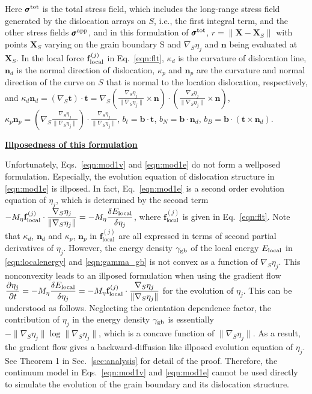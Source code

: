 Here $\pmb \sigma^{\rm tot}$ is the total stress field, which includes the
long-range stress field generated by the dislocation arrays on $S$, i.e., the first integral term, and the other stress fields $\pmb \sigma^{\rm app}$, and in this formulation of  $\pmb \sigma^{\rm tot}$,
 $r=\|\mathbf X-\mathbf X_S \| $ with points $ \mathbf X_S$ varying on the grain boundary S and $\nabla_S\eta_j$ and $\mathbf n$ being evaluated at $\mathbf X_S$. In the local force $\mathbf f_{\rm local} ^{(j)}$ in Eq.~\eqref{eqn:flt},   $\kappa_d$ is the curvature of dislocation line, $\mathbf n_d$ is the normal direction of dislocation, $\kappa_p$ and $\mathbf n_p$ are the curvature and normal direction of the curve on $S$ that is normal to the location dislocation, respectively, and $\kappa_d \mathbf n_d=(\nabla_S\mathbf t )\cdot \mathbf t=\nabla_S\left(\frac{\nabla_S \eta_j}{\|\nabla_S \eta_j\|}\times \mathbf n \right)\cdot \left(\frac{\nabla_S \eta_j}{\|\nabla_S \eta_j\|}\times \mathbf n\right)$, $\kappa_p \mathbf n_p=\left(\nabla_S \frac{\nabla_S \eta_j}{\|\nabla_S \eta_j\|} \right)\cdot \frac{\nabla_S \eta_j}{\|\nabla_S \eta_j\|} $, $b_t=\mathbf b\cdot \mathbf t$, $b_N=\mathbf b\cdot \mathbf n_d$, $b_B=\mathbf b\cdot (\mathbf t \times \mathbf n_d ) $.

\vspace{0.1in}
\noindent
\underline{\bf Illposedness of this formulation}

Unfortunately, Eqs.~\eqref{eqn:mod1v} and \eqref{eqn:mod1e} do not form a wellposed formulation. Especially,
the evolution equation of dislocation structure in \eqref{eqn:mod1e} is illposed.
In fact, Eq.~\eqref{eqn:mod1e} is a second order evolution equation of $\eta_j$, which is determined by the second term $-M_\eta \mathbf{f}^{(j)}_{\mathrm{local}}\cdot\dfrac{\nabla_S \eta_j}{\|\nabla_S \eta_j\|}=-M_\eta \dfrac{\delta E_{\rm local}}{\delta \eta_j}$,  where $\mathbf{f}^{(j)}_{\mathrm{local}}$ is given in Eq.~\eqref{eqn:flt}. Note that $\kappa_d$, $\mathbf n_d$ and $\kappa_p$, $\mathbf n_p$ in $\mathbf{f}^{(j)}_{\mathrm{local}}$ are all expressed in terms of second partial derivatives of $\eta_j$.
However,
the  energy density $\gamma_{\rm gb}$ of the local energy  $E_{\rm local}$ in \eqref{eqn:localenergy} and \eqref{eqn:gamma_gb} is not convex as a function of $\nabla_S \eta_j$.
This nonconvexity leads to an illposed formulation when using the gradient flow $\dfrac{\partial \eta_j}{\partial t}=-M_\eta \dfrac{\delta E_{\rm local}}{\delta \eta_j}=-M_\eta \mathbf{f}^{(j)}_{\mathrm{local}}\cdot\dfrac{\nabla_S \eta_j}{\|\nabla_S \eta_j\|}$ for the evolution of $\eta_j$.
This can be understood as follows. Neglecting the orientation dependence factor, the contribution of $\eta_j$ in the energy density $\gamma_{\rm gb}$ is essentially $-\|\nabla_S \eta_j\|\log\|\nabla_S \eta_j\|$, which is a concave function of $\|\nabla_S \eta_j\|$. As a result, the gradient flow gives a backward-diffusion like illposed evolution equation of $\eta_j$.  See Theorem 1 in Sec.~\ref{sec:analysis} for detail of the proof.
Therefore, the continuum model in Eqs.~\eqref{eqn:mod1v} and \eqref{eqn:mod1e} cannot be used directly to simulate the evolution of the grain boundary and its dislocation structure.





